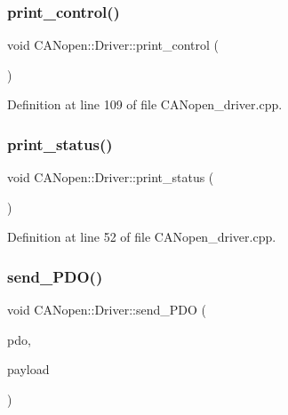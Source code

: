 \mbox{\label{class_c_a_nopen_1_1_driver_a9bddeea1ccb9854c2b775248778903b5}} 
\subsubsection{\texorpdfstring{print\+\_\+control()}{print\_control()}}
{\footnotesize\ttfamily void C\+A\+Nopen\+::\+Driver\+::print\+\_\+control (\begin{DoxyParamCaption}{ }\end{DoxyParamCaption})}



Definition at line 109 of file C\+A\+Nopen\+\_\+driver.\+cpp.

\mbox{\label{class_c_a_nopen_1_1_driver_a2aab98740682098ccbfee1b8d3476c7a}} 
\subsubsection{\texorpdfstring{print\+\_\+status()}{print\_status()}}
{\footnotesize\ttfamily void C\+A\+Nopen\+::\+Driver\+::print\+\_\+status (\begin{DoxyParamCaption}{ }\end{DoxyParamCaption})}



Definition at line 52 of file C\+A\+Nopen\+\_\+driver.\+cpp.

\mbox{\label{class_c_a_nopen_1_1_driver_ad82b69bd6c10c53ce4c7f766259ce804}} 
\subsubsection{\texorpdfstring{send\+\_\+\+P\+D\+O()}{send\_PDO()}}
{\footnotesize\ttfamily void C\+A\+Nopen\+::\+Driver\+::send\+\_\+\+P\+DO (\begin{DoxyParamCaption}\item[{\hyperlink{class_c_a_nopen_1_1_driver_af1538f81dbeb9dcafee3ff1a71c95be4}{P\+D\+O\+Function\+Code}}]{pdo,  }\item[{\hyperlink{class_c_a_nopen_1_1_payload}{Payload}}]{payload }\end{DoxyParamCaption})}



